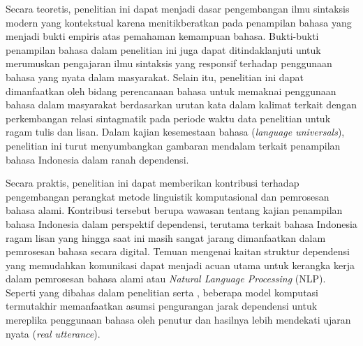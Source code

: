 Secara teoretis, penelitian ini dapat menjadi dasar pengembangan ilmu sintaksis modern yang kontekstual karena menitikberatkan pada penampilan bahasa yang menjadi bukti empiris atas pemahaman kemampuan bahasa. Bukti-bukti penampilan bahasa dalam penelitian ini juga dapat ditindaklanjuti untuk merumuskan pengajaran ilmu sintaksis yang responsif terhadap penggunaan bahasa yang nyata dalam masyarakat. Selain itu, penelitian ini dapat dimanfaatkan oleh bidang perencanaan bahasa untuk memaknai penggunaan bahasa dalam masyarakat berdasarkan urutan kata dalam kalimat terkait dengan perkembangan relasi sintagmatik pada periode waktu data penelitian untuk ragam tulis dan lisan. Dalam kajian kesemestaan bahasa (\textit{language universals}), penelitian ini turut menyumbangkan gambaran mendalam terkait penampilan bahasa Indonesia dalam ranah dependensi.

Secara praktis, penelitian ini dapat memberikan kontribusi terhadap pengembangan perangkat metode linguistik komputasional dan pemrosesan bahasa alami. Kontribusi tersebut berupa wawasan tentang kajian penampilan bahasa Indonesia dalam perspektif dependensi, terutama terkait bahasa Indonesia ragam lisan yang hingga saat ini masih sangat jarang dimanfaatkan dalam pemrosesan bahasa secara digital. Temuan mengenai kaitan struktur dependensi yang memudahkan komunikasi dapat menjadi acuan utama untuk kerangka kerja dalam pemrosesan bahasa alami atau \textit{Natural Language Processing} (NLP). Seperti yang dibahas dalam penelitian \cite{klein2004corpus} serta \cite{smith2006minimum}, beberapa model komputasi termutakhir memanfaatkan asumsi pengurangan jarak dependensi untuk mereplika penggunaan bahasa oleh penutur dan hasilnya lebih mendekati ujaran nyata (\textit{real utterance}).

